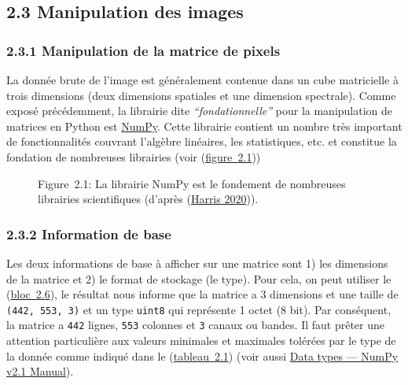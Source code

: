 \subsection{\texorpdfstring{{2.3} Manipulation des
images}{2.3 Manipulation des images}}\label{manipulation-des-images}

\subsubsection{\texorpdfstring{{2.3.1} Manipulation de la matrice de
pixels}{2.3.1 Manipulation de la matrice de pixels}}\label{manipulation-de-la-matrice-de-pixels}

La donnée brute de l'image est généralement contenue dans un cube
matricielle à trois dimensions (deux dimensions spatiales et une
dimension spectrale). Comme exposé précédemment, la librairie dite
\emph{``fondationnelle''} pour la manipulation de matrices en Python est
\href{https://numpy.org/}{NumPy}. Cette librairie contient un nombre
très important de fonctionnalités couvrant l'algèbre linéaires, les
statistiques, etc. et constitue la fondation de nombreuses librairies
(voir (\hyperref[fig-naturenumpy1]{figure~{2.1}}))

\label{fig-naturenumpy1}
\begin{figure}
\centering
{}
\caption{Figure~2.1: La librairie NumPy est le fondement de nombreuses
librairies scientifiques (d'après
{(\href{references.html\#ref-NumpyNature}{Harris 2020})}).}
\end{figure}

\subsubsection{\texorpdfstring{{2.3.2} Information de
base}{2.3.2 Information de base}}\label{information-de-base}

Les deux informations de base à afficher sur une matrice sont 1) les
dimensions de la matrice et 2) le format de stockage (le type). Pour
cela, on peut utiliser le (\hyperref[lst-numpyshape]{bloc~{2.6}}), le
résultat nous informe que la matrice a 3 dimensions et une taille de
\texttt{(442,\ 553,\ 3)} et un type \texttt{uint8} qui représente 1
octet (8 bit). Par conséquent, la matrice a \texttt{442} lignes,
\texttt{553} colonnes et \texttt{3} canaux ou bandes. Il faut prêter une
attention particulière aux valeurs minimales et maximales tolérées par
le type de la donnée comme indiqué dans le
(\hyperref[tbl-numpytype]{tableau~{2.1}}) (voir aussi
\href{https://numpy.org/doc/stable/user/basics.types.html}{Data types
--- NumPy v2.1 Manual}).


